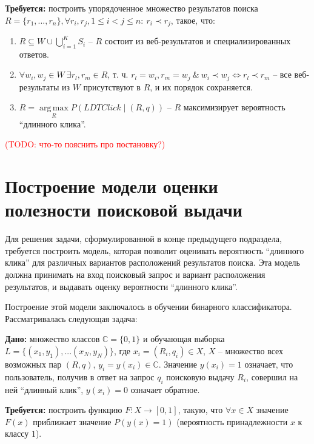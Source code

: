 \documentclass[12pt,a4paper]{report}
\newcommand\note[1]{\textcolor{red}{(#1)}}
\newcommand\todonote[1]{\note{TODO: #1}}
\DeclareMathOperator*{\argmax}{arg\,max}
\begin{document}
\textbf{Требуется:}
построить упорядоченное множество результатов поиска \linebreak $R=\{r_1, ..., r_n\}, \forall r_i, r_j, 1 \le i < j \le n: \ r_i \prec r_j$, такое, что:  
\begin{enumerate}
\item $R \subseteq W \cup \bigcup\limits_{i=1}^{K} S_i$ -- $R$ состоит из веб-результатов и специализированных ответов.
\item $\forall w_i, w_j \in W \ \exists r_l, r_m \in R$, т. ч. $r_l = w_i, r_m = w_j \ \& \ w_i \prec w_j \Leftrightarrow r_l \prec r_m$ -- все веб-результаты из $W$ присутствуют в $R$, и их порядок сохраняется.
\item $R = \argmax\limits_R P(LDTClick \mid (R, q))$ -- $R$ максимизирует вероятность ``длинного клика''.
\end{enumerate}

\todonote{что-то пояснить про постановку?}


\section{Построение модели оценки полезности поисковой выдачи}

Для решения задачи, сформулированной в конце предыдущего подраздела, требуется построить модель, которая позволит оценивать вероятность ``длинного клика'' для различных вариантов расположений результатов поиска. Эта модель должна принимать на вход поисковый запрос и вариант расположения результатов, и выдавать оценку вероятности ``длинного клика''.

Построение этой модели заключалось в обучении бинарного классификатора. Рассматривалась следующая задача: 
\vspace{3mm}

\textbf{Дано:} множество классов $\mathbb{C} = \{0,1\}$ и обучающая выборка \linebreak $L=\{ (x_1, y_1), ... (x_N, y_N)\}$, где $x_i = (R_i, q_i) \in X$, $X$ -- множество всех возможных  пар $(R, q)$, $y_i = y(x_i) \in \mathbb{C}$. Значение $y(x_i) = 1$  означает, что пользователь, получив в ответ на запрос $q_i$ поисковую выдачу $R_i$, совершил на ней ``длинный клик'', $y(x_i) = 0$ означает обратное.

\textbf{Требуется:}
построить функцию $F: X \rightarrow [0,1]$, такую, что $\forall x \in X$ значение $F(x)$ приближает значение $P(y(x) = 1)$ (вероятность принадлежности $x$ к классу $1$).
\vspace{3mm}
\end{document}
